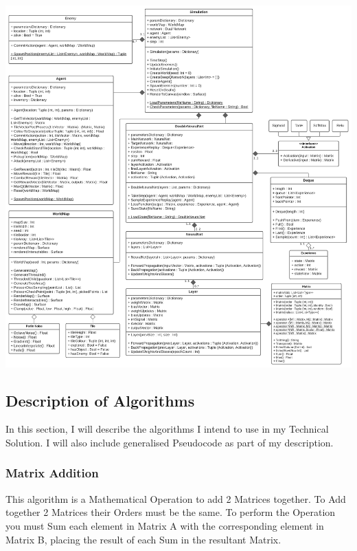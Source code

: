 \begin{flushleft}
            \pagebreak
            \vspace{0.5cm}
            \centerline{\includegraphics[width=18cm]{Images/Design/ClassDiagram.png}}
            \vspace{0.5cm}
            \pagebreak
        \subsection{Description of Algorithms}
            \large
            \vspace{0.2cm}
            In this section, I will describe the algorithms I intend to use in my Technical Solution. I will also include generalised
            Pseudocode as part of my description.

            \subsubsection{Matrix Addition}
                This algorithm is a Mathematical Operation to add 2 Matrices together. To Add together 2 Matrices their Orders
                must be the same. To perform the Operation you must Sum each element in Matrix A with the corresponding element 
                in Matrix B, placing the result of each Sum in the resultant Matrix.


\end{flushleft}
